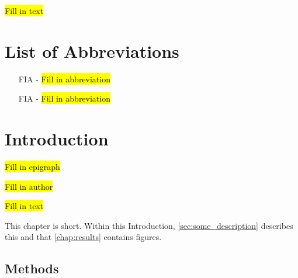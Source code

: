 \documentclass[oneside]{book}
\begin{document}
\hl{Fill in text}

\chaptercloser

\pagestyle{plain}
\renewcommand{\contentsname}{Table of Contents}
\tableofcontents
\clearpage

\listoffigures
{}
\clearpage

\listoftables
{}
\clearpage


\chapter{List of Abbreviations}
\begin{itemize}
\item[FIA - ] \hl{Fill in abbreviation}
\item[FIA - ] \hl{Fill in abbreviation}
\end{itemize}


\mainmatter %
\chapter{Introduction}

\pagestyle{fancy}

\label{chap:introduction}
\epigraph{\hl{Fill in epigraph}}{\hl{Fill in author}}

\hl{Fill in text}\cite{citation1, citation2}

This chapter is short.
Within this Introduction,
\autoref{sec:some_description} describes this and that
\autoref{chap:results} contains figures.

\section{Methods}
\label{sec:some_description}
\end{document}
